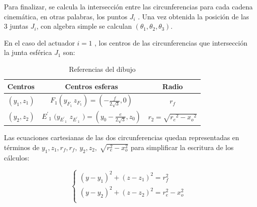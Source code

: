         Para finalizar, se calcula la intersecci\'{o}n entre las circunferencias para cada cadena cinem\'{a}tica, en otras palabras, los puntos  $J_i$ . Una vez obtenida la posici\'{o}n de las 3 juntas $J_i$, con algebra simple se calculan $\left({\theta }_1,{\theta }_2,{\theta }_3\right)$.
        
                \newpage


        En el caso del actuador  $i=1$ , los centros de las circunferencias que intersección la junta esf\'{e}rica $J_1$ son:
        
        \begin{center}
        \renewcommand{\arraystretch}{2.5}
        
            \begin{table}[H]
            \centering
            \begin{tabular}{p{1.4cm} c c } 
                 \hline
                 \textbf{Centros}  &  \textbf{Centros esferas}  & \textbf{Radio} \\ [0.1ex] 
                 \hline\hline
                         $\left(y_1,z_1\right)$ &
                        $F_1\left(y_{F_1}\,z_{F_1}\right)=\left(-\frac{f}{2\sqrt{3}},0\right)$\textit{} & 
                                                 $r_f$  \\ 
                \hline
                          $(y_2,z_2)$&
                          ${E^'}_{1}$ $(y_{{E^'}_1}$ $z_{{E^'}_1}$ $)=(y_0-\frac{e}{2\sqrt{3}},z_0)$ &
                          $r_2=\sqrt{{r_e}^2-{x_o}^2}$ \\
                \hline
            \end{tabular}
            \caption{Referencias del dibujo}
            \label{tab:cap4_tabla_4}
            \end{table}
        \end{center}
    \vspace{-2.5em}
        
Las ecuaciones cartesianas de las dos circunferencias quedan representadas en términos de  $y_{1},z_{1},r_{f},r_{f},~y_{2},z_{2},\sqrt[]{r_{e}^{2}-x_{o}^{2}}$ para simplificar la escritura de los cálculos:

    \begin{equation}
    \left\lbrace
    \begin{array}{ll}
    \left( y-y_{1} \right) ^{2} + \left( z-z_{1} \right) ^{2}= r_{f}^{2}~\\
    \left( y-y_{2} \right) ^{2} + \left( z-z_{2} \right) ^{2}= r_{e}^{2}-x_{o}^{2}\\ 
    \end{array}
    \right.
    \label{eq:cap4_eq_15}
    \end{equation}

